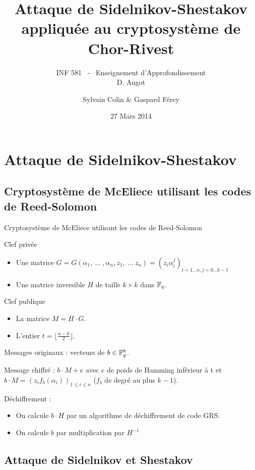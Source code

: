 \documentclass[]{beamer}
\title[Attaque de Chor-Rivest]{Attaque de Sidelnikov-Shestakov appliquée au cryptosystème de Chor-Rivest }
\subtitle{INF 581 \ - \ Enseignement d'Approfondissement \\ D. Augot}
\author[S. Colin \& G. Férey]{Sylvain Colin \& Gaspard Férey}
\institute[X 2011]{Département d'Informatique\\ Ecole Polytechnique, France }
\date{27 Mars 2014}
\begin{document}
\begin{frame}[plain]
  \titlepage
\end{frame}


\section{Attaque de Sidelnikov-Shestakov}

\subsection{Cryptosystème de McEliece utilisant les codes de Reed-Solomon}

\begin{frame}{Cryptosystème de McEliece utilisant les codes de Reed-Solomon}

Clef privée
\begin{itemize}
\item Une matrice $G = G(\alpha_1, \ ... \ , \alpha_n , z_1 , \ ... \ z_n) = (z_i\alpha_i^{j})_{i=1...n, j=0...k-1}$
\item Une matrice inversible $H$ de taille $k\times k$ dans $\mathbb{F}_q$.
\end{itemize}
Clef publique
\begin{itemize}
 \item La matrice $M=H\cdot G$.
 \item L'entier $t=\lfloor\frac{n-k}{2}\rfloor$.
\end{itemize}
Messages originaux : vecteurs de $b\in \mathbb{F}_q^{k}$.

Message chiffré : $b\cdot M + e$ avec $e$ de poids de Hamming inférieur à t et $b\cdot M=(z_if_b(\alpha_i))_{1\leq i\leq n}$ ($f_b$ de degré au plus $k-1$).

Déchiffrement :
\begin{itemize}
 \item On calcule $b\cdot H$ par un algorithme de déchiffrement de code GRS.
 \item On calcule $b$ par multiplication par $H^{-1}$
\end{itemize}

\end{frame}


\subsection{Attaque de Sidelnikov et Shestakov}
\end{document}
